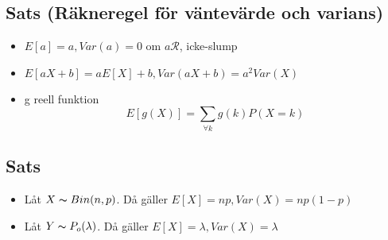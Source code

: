 \documentclass{article}
\begin{document}
\subsection{Sats (Räkneregel för väntevärde och varians)}
\begin{itemize}
  \item $E[a] =a, Var(a)=0 $ om $a\mathcal{R}$, icke-slump
  \item $E[aX+b] =aE[X]+b, Var(aX+b)=a^2Var(X) $
  \item g reell funktion
    $$ E[g(X)] = \sum_{\forall k} g(k)P(X=k)  $$
\end{itemize}

\subsection{Sats}
\begin{itemize}
  \item Låt $X\thicksim Bin(n, p)$. Då gäller $E[X]=np, Var(X) = np(1-p)$
  \item Låt $Y\thicksim P_o(\lambda)$. Då gäller $E[X]=\lambda, Var(X) = \lambda$
\end{itemize}
\end{document}
